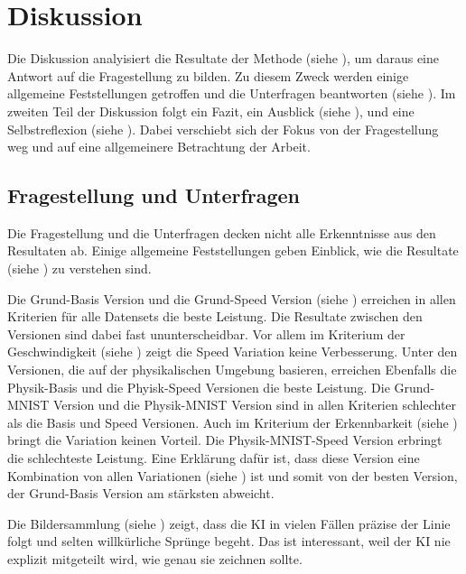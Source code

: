 \chapter{Diskussion}
\label{chap:d}
Die Diskussion analyisiert die Resultate der Methode (siehe ),
um daraus eine Antwort auf die Fragestellung zu bilden. Zu diesem Zweck werden
einige allgemeine Feststellungen getroffen  und die Unterfragen beantworten
(siehe ). Im zweiten Teil der Diskussion folgt ein Fazit,
ein Ausblick (siehe ), und eine Selbstreflexion (siehe
). Dabei verschiebt sich der Fokus von der Fragestellung
weg und auf eine allgemeinere Betrachtung der Arbeit.


\section{Fragestellung und Unterfragen}
\label{chap:d_frage}
Die Fragestellung und die Unterfragen decken nicht alle Erkenntnisse aus den
Resultaten ab. Einige allgemeine Feststellungen geben Einblick, wie die
Resultate (siehe ) zu verstehen sind. 

Die Grund-Basis Version und die Grund-Speed Version (siehe
) erreichen in allen Kriterien für alle Datensets die
beste Leistung. Die Resultate zwischen den Versionen sind dabei fast
ununterscheidbar. Vor allem im Kriterium der Geschwindigkeit (siehe
) zeigt die Speed Variation keine Verbesserung. Unter
den Versionen, die auf der physikalischen Umgebung basieren, erreichen Ebenfalls
die Physik-Basis und die Phyisk-Speed Versionen die beste Leistung. Die
Grund-MNIST Version und die Physik-MNIST Version sind in allen Kriterien
schlechter als die Basis und Speed Versionen. Auch im Kriterium der
Erkennbarkeit (siehe ) bringt die Variation keinen
Vorteil. Die Physik-MNIST-Speed Version erbringt die schlechteste Leistung. Eine
Erklärung dafür ist, dass diese Version eine Kombination von allen Variationen
(siehe ) ist und somit von der besten Version, der
Grund-Basis Version am stärksten abweicht.

Die Bildersammlung (siehe ) zeigt, dass die KI in vielen
Fällen präzise der Linie folgt und selten willkürliche Sprünge begeht. Das ist
interessant, weil der KI nie explizit mitgeteilt wird, wie genau sie zeichnen
sollte.


